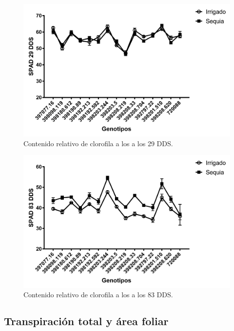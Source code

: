 \documentclass[fleqn,10pt]{Flavio}\usepackage[]{graphicx}\usepackage[]{color}
\begin{document}
\begin{figure}[ht]\centering
\includegraphics[width=\linewidth]{SPAD29DDS}
\caption{Contenido relativo de clorofila a los a los 29 DDS.}
\label{fig:SPAD}
\end{figure}

\begin{figure}[ht]\centering
\includegraphics[width=\linewidth]{SPAD83DDS}
\caption{Contenido relativo de clorofila a los a los 83 DDS.}
\label{fig:SPAD2}
\end{figure}

\subsection{Transpiraci\'on total y \'area foliar}
\end{document}
